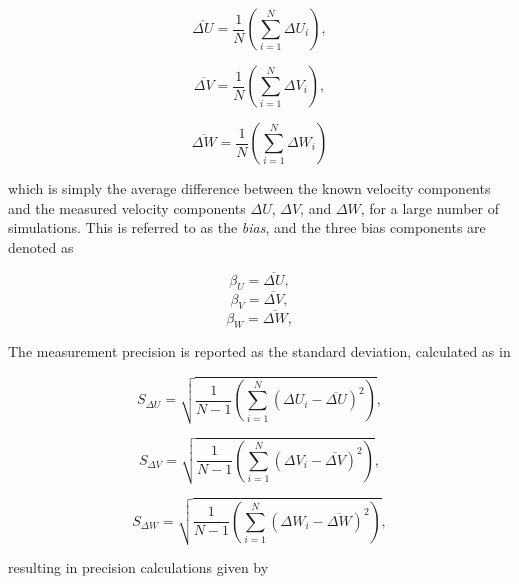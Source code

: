 \begin{equation}
\overline{\Delta U} = \frac{1}{N} \left(\sum_{i=1}^N \Delta U_i \right),
\label{eq:Uerror}
\end{equation}

\begin{equation}
\overline{\Delta V} = \frac{1}{N} \left(\sum_{i=1}^N \Delta V_i \right),
\label{eq:Verror}
\end{equation}

\begin{equation}
\overline{\Delta W} = \frac{1}{N} \left(\sum_{i=1}^N \Delta W_i \right)
\label{eq:Werror}
\end{equation}

\noindent
which is simply the average difference between the known velocity components 
and the measured velocity components $\Delta U$, $\Delta V$, and $\Delta W$, 
for a large number of simulations. This is referred to as the \textit{bias}, 
and the three bias components are denoted as

\begin{equation}
\beta_{U} = \overline{\Delta U},
\label{eq:Ubias}
\end{equation}
\begin{equation}
\beta_{V} = \overline{\Delta V},
\label{eq:Vbias}
\end{equation}
\begin{equation}
\beta_{W} = \overline{\Delta W},
\label{eq:Wbias}
\end{equation}

The measurement precision is reported as the  
standard deviation, calculated as in 
	
\begin{equation}
S_{\Delta U} = \sqrt{\frac{1}{N-1} \left(\sum_{i=1}^N (\Delta U_i - 
\overline{\Delta U})^2 \right)},
\label{eq:Usd}
\end{equation}

\begin{equation}
S_{\Delta V} = \sqrt{\frac{1}{N-1} \left(\sum_{i=1}^N (\Delta V_i - 
	\overline{\Delta V})^2 \right)},
\label{eq:Vsd}
\end{equation}

\begin{equation}
S_{\Delta W} = \sqrt{\frac{1}{N-1} \left(\sum_{i=1}^N (\Delta W_i - 
	\overline{\Delta W})^2 \right)},
\label{eq:Wsd}
\end{equation}

\noindent
resulting in precision calculations given by 
	

